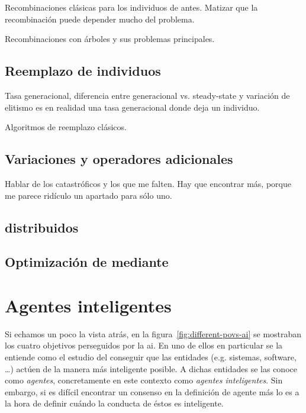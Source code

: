 Recombinaciones clásicas para los individuos de antes. Matizar que la recombinación puede depender mucho del problema.

Recombinaciones con árboles y sus problemas principales.

\subsection{Reemplazo de individuos}

Tasa generacional, diferencia entre generacional vs. steady-state y variación de elitismo es en realidad una tasa generacional donde deja un individuo.

Algoritmos de reemplazo clásicos.

\subsection{Variaciones y operadores adicionales}

Hablar de los catastróficos y los que me falten. Hay que encontrar más, porque me parece ridículo un apartado para sólo uno.

\subsection{ distribuidos}

\subsection{Optimización de  mediante }

\section{Agentes inteligentes}
\label{ch:ci:s:agent-concept}

Si echamos un poco la vista atrás, en la figura~\ref{fig:different-povs-ai} se mostraban los cuatro objetivos perseguidos por la \ac{ai}. En uno de ellos en particular se la entiende como el estudio del conseguir que las entidades (e.g. sistemas, software, \ldots) actúen de la manera más inteligente posible. A dichas entidades se las conoce como \textit{agentes}, concretamente en este contexto como \textit{agentes inteligentes}. Sin embargo, si es difícil encontrar un consenso en la definición de agente más lo es a la hora de definir cuándo la conducta de éstos es inteligente.

